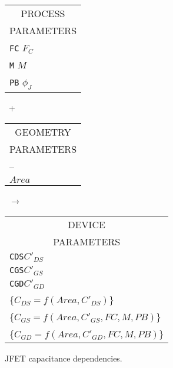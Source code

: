 \begin{figure}[hbp]
\begin{tabular}[t]{|p{1in}|}
\hline
\multicolumn{1}{|c|}{PROCESS} \\
\multicolumn{1}{|c|}{PARAMETERS} \\
\hline
{\tt FC} \hfill $F_C$\\
{\tt M} \hfill $M$\\
{\tt PB} \hfill $\phi_J$\\
\hline
\end{tabular}
\hfill
\parbox{0.1in}{\ \vspace*{0.2in}\newline +}
\hfill
\begin{tabular}[t]{|p{1in}|}
\hline
\multicolumn{1}{|c|}{GEOMETRY} \\
\multicolumn{1}{|c|}{PARAMETERS} \\
\hline
\hspace*{\fill} -- \hspace*{\fill} \\
\hline
$Area$\\
\hline
\end{tabular}
\hfill
\parbox{0.1in}{\ \vspace*{0.2in}\newline $\rightarrow$}
\hfill
\begin{tabular}[t]{|p{1.8in}|}
\hline
\multicolumn{1}{|c|}{DEVICE} \\
\multicolumn{1}{|c|}{PARAMETERS} \\
\hline
{\tt CDS}\hfill$C'_{DS}$\\
{\tt CGS}\hfill$C'_{GS}$\\
{\tt CGD}\hfill$C'_{GD}$\\
\{$C_{DS} = f(Area, C'_{DS})$\}\\
\{$C_{GS} =$\newline\hspace*{\fill}$ f(Area, C'_{GS}, FC, M, PB)$\}\\
\{$C_{GD} =$\newline\hspace*{\fill}$ f(Area, C'_{GD}, FC, M, PB)$\}\\
\hline
\end{tabular}
\caption{JFET capacitance dependencies. \label{jcap}}
\end{figure}


